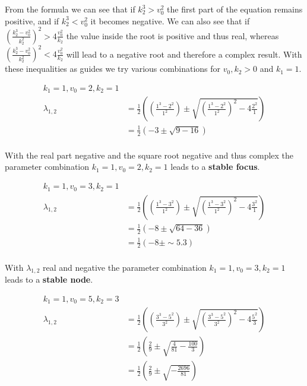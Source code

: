 \documentclass[]{scrartcl}
\begin{document}
\noindent From the formula we can see that if $k_2^3 > v_0^2$ the first part of the equation remains positive, and if $k_2^3 < v_0^2$ it becomes negative.
We can also see that if $\left( \frac{k_2^3 - v_0^2}{k_2^2}  \right)^2 > 4 \frac{v_0^2}{k_2}$ the value inside the root is positive and thus real, whereas $\left( \frac{k_2^3 - v_0^2}{k_2^2}  \right)^2 < 4 \frac{v_0^2}{k_2}$ will lead to a negative root and therefore a complex result. With these inequalities as guides we try various combinations for $v_0, k_2 > 0$ and $k_1 = 1$.


\begin{center}
\begin{align*}
	k_1 = 1, v_0 = 2, k_2 = 1 & \\
	\lambda_{1,2}	& =  \frac{1}{2} \left( \left( \frac{1^3 - 2^2}{1^2} \right) \pm \sqrt{ \left( \frac{1^3 - 2^2}{1^2}  \right)^2 - 4 \frac{2^2}{1} } \right) \\
					& =  \frac{1}{2} \left( -3 \pm \sqrt{ 9 - 16 } \right) \\
\end{align*}
\end{center}

With the real part negative and the square root negative and thus complex the parameter combination $k_1 = 1, v_0 = 2, k_2 = 1$ leads to a \textbf{stable focus}.


\begin{center}
\begin{align*}
	k_1 = 1, v_0 = 3, k_2 = 1 & \\
	\lambda_{1,2}	& =  \frac{1}{2} \left( \left( \frac{1^3 -3^2}{1^2} \right) \pm \sqrt{ \left( \frac{1^3 - 3^2}{1^2}  \right)^2 - 4 \frac{3^2}{1} } \right) \\
					& =  \frac{1}{2} \left( -8 \pm \sqrt{ 64 - 36 } \right) \\
					& =  \frac{1}{2} \left( -8 \pm \sim 5.3 \right) \\
\end{align*}
\end{center}

With $\lambda_{1,2}$ real and negative the parameter combination $k_1 = 1, v_0 = 3, k_2 = 1$ leads to a \textbf{stable node}.

\begin{center}
\begin{align*}
	k_1 = 1, v_0 = 5, k_2 = 3 & \\
	\lambda_{1,2}	& =  \frac{1}{2} \left( \left( \frac{3^3 - 5^2}{3^2} \right) \pm \sqrt{ \left( \frac{3^3 - 5^2}{3^2}  \right)^2 - 4 \frac{5^2}{3} } \right) \\
					& =  \frac{1}{2} \left( \frac{2}{9} \pm \sqrt{ \frac{4}{81} - \frac{100}{3} } \right) \\
					& =  \frac{1}{2} \left( \frac{2}{9} \pm \sqrt{ -\frac{2696}{81} } \right) \\
\end{align*}
\end{center}
\end{document}
